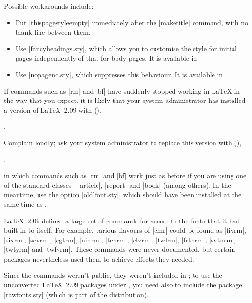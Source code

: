 \begin{changemargin}{-1cm}{-1cm}
Possible workarounds include: 
\begin{itemize}
\item Put \cs|thispagestyle{empty}| immediately after the \cs|maketitle|
  command, with no blank line between them.
\item Use \File|fancyheadings.sty|, which allows you to customise the
  style for initial pages independently of that for body pages.  It is
  available in 
\item Use \File|nopageno.sty|, which suppresses this behaviour.  It is
  available in 
\end{itemize}


If commands such as \cs|rm| and \cs|bf| have suddenly stopped working in 
\LaTeX{} in the way that you expect, it is likely that your system
administrator has installed a version of \LaTeX{}~2.09 with
\htmlignore
{} ().
\endhtmlignore
\begin{htmlversion}
.
\end{htmlversion}
Complain loudly; ask 
your system administrator to replace this version with
\htmlignore
\LaTeXe{} (),
\endhtmlignore
\begin{htmlversion}
,
\end{htmlversion}
in which commands such as \cs|rm| and \cs|bf| work just as before if you
are using one of the standard classes---|article|, |report| and |book|
(among others).  In the meantime, use the option
\File|oldlfont.sty|, which should have been installed at the same time
as .


\LaTeX{}~2.09 defined a large set of commands for access to the fonts
that it had built in to itself.  For example, various flavours of
|cmr| could be found as \cs|fivrm|, \cs|sixrm|, \cs|sevrm|,
\cs|egtrm|, \cs|ninrm|, \cs|tenrm|, \cs|elvrm|, \cs|twlrm|,
\cs|frtnrm|, \cs|svtnrm|, \cs|twtyrm| and \cs|twfvrm|.
These commands were never documented, but certain packages
nevertheless used them to achieve effects they needed.

Since the commands weren't public, they weren't included in \LaTeXe{};
to use the unconverted \LaTeX{}~2.09 packages under \LaTeXe{}, you need
also to include the package \File|rawfonts.sty| (which is part of the
\LaTeXe{} distribution).


\end{changemargin}
